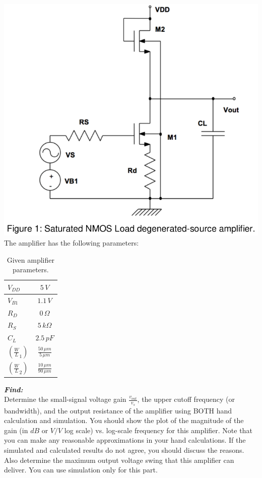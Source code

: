 \documentclass[12pt, fleqn]{article}
\begin{document}
\includegraphics[scale=0.35, center]{p1nmos.PNG}\\

The amplifier has the following parameters:

\begin{table}[H]
\centering
\setlength{\tabcolsep}{20pt}
\renewcommand{\arraystretch}{1.5}
\begin{tabular}{|l|c|}
    \hline
    $V_{DD}$ & $5\,V$\\
    \hline
    $V_{B1}$ & $1.1\,V$\\
    \hline
    $R_D$ & $0\,\Omega$\\
    \hline
    $R_S$ & $5\,k\Omega$\\
    \hline
    $C_L$ & $2.5\,pF$\\
    \hline
    $\left(\frac{W}{L}_1\right)$ & $\frac{50\,\mu m}{5\,\mu m}$\\
    \hline
    $\left(\frac{W}{L}_2\right)$ & $\frac{10\,\mu m}{90\,\mu m}$\\
    \hline
\end{tabular}
\caption{Given amplifier parameters.
\label{tab:amp_param}} 
\end{table}

\noindent
\textbf{\emph{Find: }}\\[0.25cm]
\noindent
Determine the small-signal voltage gain $\frac{v_{out}}{v_s}$, the upper cutoff frequency (or bandwidth), and the output resistance of the amplifier using BOTH hand calculation and simulation. You should show the plot of the magnitude of the gain (in $dB$ or $V/V$ log scale) vs. log-scale frequency for this amplifier. Note that you can make any reasonable approximations in your hand calculations.  If the simulated and calculated results do not agree, you should discuss the reasons. Also determine the maximum output voltage swing that this amplifier can deliver. You can use simulation only for this part.
\end{document}
